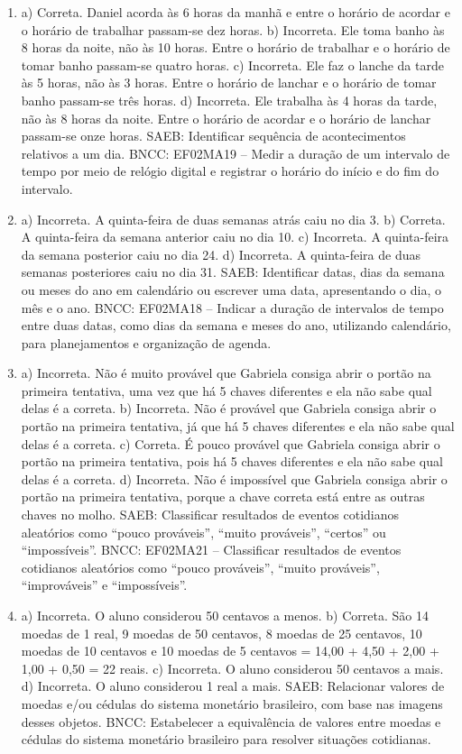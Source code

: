 \begin{enumerate}
\item
a) Correta. Daniel acorda às 6 horas da manhã e entre o horário de acordar e o horário de trabalhar passam-se dez horas.
b) Incorreta. Ele toma banho às 8 horas da noite, não às 10 horas. Entre o horário de trabalhar e o horário de tomar banho passam-se quatro horas.
c) Incorreta. Ele faz o lanche da tarde às 5 horas, não às 3 horas. Entre o horário de lanchar e o horário de tomar banho passam-se três horas.
d) Incorreta. Ele trabalha às 4 horas da tarde, não às 8 horas da noite. Entre o horário de acordar e o horário de lanchar passam-se onze horas.
SAEB: Identificar sequência de acontecimentos relativos a um dia.
BNCC: EF02MA19 -- Medir a duração de um intervalo de tempo por meio de
relógio digital e registrar o horário do início e do fim do intervalo.

\item
a) Incorreta. A quinta-feira de duas semanas atrás caiu no dia 3.
b) Correta. A quinta-feira da semana anterior caiu no dia 10.
c) Incorreta. A quinta-feira da semana posterior caiu no dia 24.
d) Incorreta. A quinta-feira de duas semanas posteriores caiu no dia 31.
SAEB: Identificar datas, dias da semana ou meses do ano em
calendário ou escrever uma data, apresentando o dia, o mês e o ano.
BNCC: EF02MA18 -- Indicar a duração de intervalos de tempo entre duas
datas, como dias da semana e meses do ano, utilizando calendário, para
planejamentos e organização de agenda.

\item
a) Incorreta. Não é muito provável que Gabriela consiga abrir o portão
na primeira tentativa, uma vez que há 5 chaves diferentes e ela não sabe
qual delas é a correta.
b) Incorreta. Não é provável que Gabriela consiga abrir o portão na
primeira tentativa, já que há 5 chaves diferentes e ela não sabe qual
delas é a correta.
c) Correta. É pouco provável que Gabriela consiga abrir o portão na
primeira tentativa, pois há 5 chaves diferentes e ela não sabe qual
delas é a correta.
d) Incorreta. Não é impossível que Gabriela consiga abrir o portão na
primeira tentativa, porque a chave correta está entre as outras chaves
no molho.
SAEB: Classificar resultados de eventos cotidianos aleatórios
como ``pouco prováveis'', ``muito prováveis'', ``certos'' ou
``impossíveis''.
BNCC: EF02MA21 -- Classificar resultados de eventos cotidianos aleatórios
como ``pouco prováveis'', ``muito prováveis'', ``improváveis'' e ``impossíveis''.

\item
a) Incorreta. O aluno considerou 50 centavos a menos.
b) Correta. São 14 moedas de 1 real, 9 moedas de 50 centavos, 8 moedas
de 25 centavos, 10 moedas de 10 centavos e 10 moedas de 5 centavos =
14,00 + 4,50 + 2,00 + 1,00 + 0,50 = 22 reais.
c) Incorreta. O aluno considerou 50 centavos a mais.
d) Incorreta. O aluno considerou 1 real a mais.
SAEB: Relacionar valores de moedas e/ou cédulas do sistema
monetário brasileiro, com base nas imagens desses objetos.
BNCC: Estabelecer a equivalência de valores entre moedas e
cédulas do sistema monetário brasileiro para resolver situações
cotidianas.


\end{enumerate}
